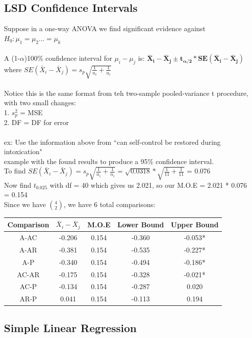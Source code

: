 \documentclass[12pt, a4paper]{article}
\begin{document}
	\subsection{LSD Confidence Intervals}
	Suppose in a one-way ANOVA we find significant evidence against $H_0: \mu_1 = \mu_2 ... = \mu_k$ \\~\\
	A (1-$\alpha$)100\% confidence interval for $\mu_i-\mu_j$ is: $\bm{\bar{X}_i-\bar{X}_j \pm t_{\alpha/2}*SE(\bar{X}_i-\bar{X}_j)}$ where $SE(\bar{X}_i-\bar{X}_j) = s_p\sqrt{\frac{1}{n_i} + \frac{1}{n_i}}$ \\~\\
	Notice this is the same format from teh two-sample pooled-variance t procedure, with two small changes: \\
	1. $s^2_p$ = MSE \\
	2. DF = DF for error \\~\\
	ex: Use the information above from ``can self-control be restored during intoxication" \\ example with the found results to produce a 95\% confidence interval. \\
	To find $SE(\bar{X}_i-\bar{X}_j) =  s_p\sqrt{\frac{1}{n_i} + \frac{1}{n_i}} = \sqrt{0.0318}*\sqrt{\frac{1}{11}+\frac{1}{11}}$ = 0.076 \\
	Now find $t_{0.025}$ with df = 40 which gives us 2.021, so our M.O.E = 2.021 * 0.076 = 0.154 \\
	Since we have $\binom{4}{2}$, we have 6 total comparisons: \\
	\begin{tabular}{ |c|c|c|c|c| }
		\hline
		Comparison & $\bar{X}_i-\bar{X}_j$ & M.O.E & Lower Bound & Upper Bound \\ \hline
		A-AC & -0.206 & 0.154 & -0.360 & -0.053* \\
		A-AR & -0.381 & 0.154 & -0.535 & -0.227* \\
		A-P & -0.340 & 0.154 & -0.494 & -0.186* \\
		AC-AR & -0.175 & 0.154 & -0.328 & -0.021* \\
		AC-P & -0.134 & 0.154 & -0.287 & 0.020 \\
		AR-P & 0.041 & 0.154 & -0.113 & 0.194 \\
		\hline
	\end{tabular} \newpage

\begin{center} \section{Simple Linear Regression} \end{center}
\end{document}
